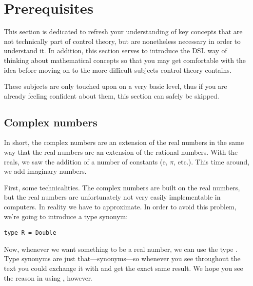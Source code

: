 \graphicspath{ {./Images/} }

\section{Prerequisites}
This section is dedicated to refresh your understanding of key concepts that are not technically part of control theory, but are nonetheless necessary in order to understand it. In addition, this section 
serves to introduce the DSL way of thinking about mathematical concepts so that you may get comfortable with the idea before moving on to the more difficult subjects control theory contains. %

These subjects are only touched upon on a very basic level, thus if you are already feeling confident about them, this section can safely be skipped.

\subsection{Complex numbers}\label{sec:complex}

In short, the complex numbers are an extension of the real numbers in the same way that the real numbers are an extension of the rational numbers. With the reals, we saw the addition of a number of constants (e, $\pi$, etc.).
This time around, we add imaginary numbers.

First, some technicalities. The complex numbers are built on the real numbers, but the real numbers are unfortunately not very easily implementable in computers. In reality we have to approximate. In order to avoid this problem, we're going to introduce a type synonym: 

\begin{verbatim}
type R = Double 
\end{verbatim}

Now, whenever we want something to be a real number, we can use the type . Type synonyms are just that---synonyms---so whenever you see  throughout the text you could exchange it with  and get the exact same result. We hope you see the reason in using , however. 

